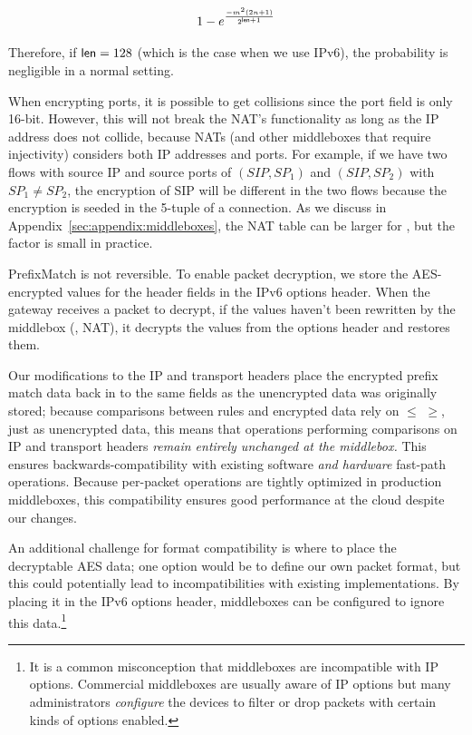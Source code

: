\begin{equation}
1 - e^\frac{-m^2 (2n+1)}{2^{\mathsf{len}+1}}
\end{equation}


Therefore, if $\mathsf{len}=128$ (which is the case when we use IPv6), the probability is negligible in a normal setting. 

When encrypting ports, it is possible to get collisions since the port field is only 16-bit. However, this will not break the NAT's functionality as long as the IP address does not collide, because NATs (and other middleboxes that require injectivity) considers both IP addresses and ports. For example, if we have two flows with source IP and source ports of $(SIP, SP_1)$ and $(SIP, SP_2)$ with $SP_1 \neq SP_2$, the encryption of SIP will be different in the two flows because the encryption is seeded in the 5-tuple of a connection. As we discuss in Appendix~\ref{sec:appendix:middleboxes}, the NAT table can be larger for \sys, but the factor is small in practice.




PrefixMatch is not reversible. To enable packet decryption, we store the AES-encrypted values for the header fields in the IPv6 options header. 
When the gateway receives a packet to decrypt, if the values haven't been rewritten by the middlebox (\eg, NAT),
it decrypts the values from the options header and restores them. 

Our modifications to the IP and transport headers place the encrypted prefix match data back in to the same fields as the unencrypted data was originally stored; because comparisons between rules and encrypted data rely on $\leq$ $\geq$, just as unencrypted data, this means that operations performing comparisons on IP and transport headers {\it remain entirely unchanged at the middlebox.}
This ensures backwards-compatibility with existing software {\it and hardware} fast-path operations.
Because per-packet operations are tightly optimized in production middleboxes, this compatibility ensures good performance at the cloud despite our changes.

An additional challenge for format compatibility is where to place the decryptable AES data; one option would be to define our own packet format, but this could potentially lead to incompatibilities with existing implementations. By placing it in the IPv6 options header, middleboxes can be configured to ignore this data.\footnote{It is a common misconception that middleboxes are incompatible with IP options. Commercial middleboxes are usually aware of IP options but many administrators {\it configure} the devices to filter or drop packets with certain kinds of options enabled.}


